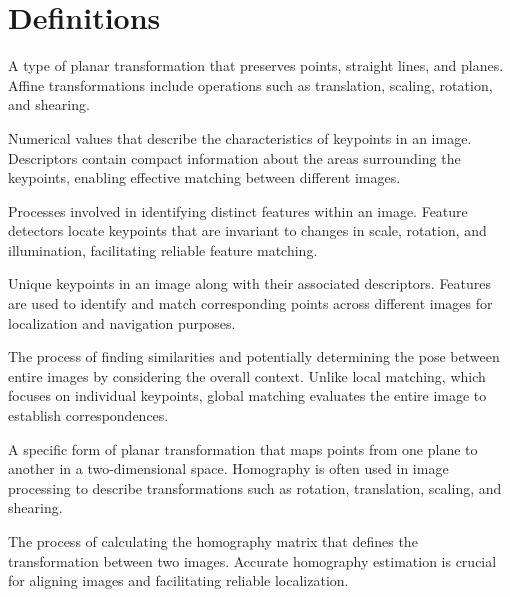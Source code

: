 \section{Definitions}

\begin{description}[leftmargin=!, labelwidth=\widthof{\bfseries Mutual Information}]

    \item[\textbf{Affine Transformation}] 
    A type of planar transformation that preserves points, straight lines, and planes. Affine transformations include operations such as translation, scaling, rotation, and shearing.

    \item[\textbf{Descriptors}] 
    Numerical values that describe the characteristics of keypoints in an image. Descriptors contain compact information about the areas surrounding the keypoints, enabling effective matching between different images.

    \item[\textbf{Feature Detectors (or Extractors)}] 
    Processes involved in identifying distinct features within an image. Feature detectors locate keypoints that are invariant to changes in scale, rotation, and illumination, facilitating reliable feature matching.

    \item[\textbf{Features}] 
    Unique keypoints in an image along with their associated descriptors. Features are used to identify and match corresponding points across different images for localization and navigation purposes.

    \item[\textbf{Global Matching}] 
    The process of finding similarities and potentially determining the pose between entire images by considering the overall context. Unlike local matching, which focuses on individual keypoints, global matching evaluates the entire image to establish correspondences.

    \item[\textbf{Homography}] 
    A specific form of planar transformation that maps points from one plane to another in a two-dimensional space. Homography is often used in image processing to describe transformations such as rotation, translation, scaling, and shearing.

    \item[\textbf{Homography Estimation}] 
    The process of calculating the homography matrix that defines the transformation between two images. Accurate homography estimation is crucial for aligning images and facilitating reliable localization.


\end{description}

